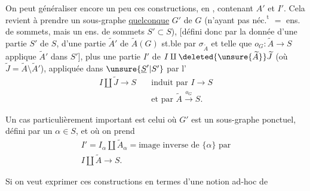 On peut généraliser encore un peu ces constructions, en    , contenant $A'$ et $I'$. Cela revient à prendre un sous-graphe \uline{quelconque} $G'$ de $G$ (n'ayant pas $\text{néc.}^{\text{t}}$  $=$ ens. de sommets, mais un ens. de sommets $S'\subset S$), [défini donc par la donnée d'une partie $S'$ de $S$, d'une partie $\widetilde A'$ de $\widetilde A(G)$ st.ble par $\sigma_{\widetilde A}$ et telle que $o_G:\widetilde A\longrightarrow S$ applique $\widetilde A'$ dans $S'$], plus une partie $I'$ de $I\amalg\deleted{\unsure{\widetilde A}}\widetilde J$ (où $\widetilde J=\widetilde A\setminus\widetilde A'$), appliquée dans $\unsure{\underline{S}'|S'}$ par l'
\[
\begin{aligned}
I\amalg\widetilde J\longrightarrow S\quad &\text{induit par }I\longrightarrow S\\
&\text{et par }\widetilde A\xrightarrow{o_G}S.
\end{aligned}
\]

Un cas particulièrement important est celui où $G'$ est un sous-graphe ponctuel, défini par un $\alpha\in S$,  et où on prend
\[
\begin{gathered}
I'=I_\alpha\amalg\widetilde A_\alpha=\text{image inverse de }\{\alpha\}\text{ par}\\
I\amalg\widetilde A\longrightarrow S.
\end{gathered}
\]

Si on veut exprimer ces constructions en termes d'une notion ad-hoc de
